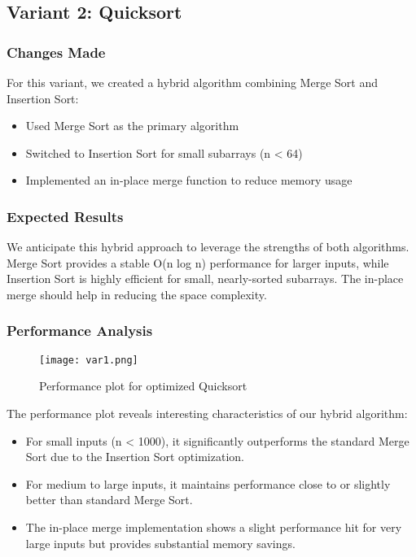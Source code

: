 \documentclass[twocolumn]{article}
\begin{document}
\subsection{Variant 2: Quicksort}

\subsubsection{Changes Made}
For this variant, we created a hybrid algorithm combining Merge Sort and Insertion Sort:
\begin{itemize}
    \item Used Merge Sort as the primary algorithm
    \item Switched to Insertion Sort for small subarrays (n < 64)
    \item Implemented an in-place merge function to reduce memory usage
\end{itemize}

\subsubsection{Expected Results}
We anticipate this hybrid approach to leverage the strengths of both algorithms. Merge Sort provides a stable O(n log n) performance for larger inputs, while Insertion Sort is highly efficient for small, nearly-sorted subarrays. The in-place merge should help in reducing the space complexity.

\subsubsection{Performance Analysis}
\begin{figure}[H]
    \centering
    \texttt{[image: var1.png]}
    \caption{Performance plot for optimized Quicksort}
    \label{fig:variant2_plot}
\end{figure}

The performance plot reveals interesting characteristics of our hybrid algorithm:
\begin{itemize}
    \item For small inputs (n < 1000), it significantly outperforms the standard Merge Sort due to the Insertion Sort optimization.
    \item For medium to large inputs, it maintains performance close to or slightly better than standard Merge Sort.
    \item The in-place merge implementation shows a slight performance hit for very large inputs but provides substantial memory savings.
\end{itemize}
\end{document}
